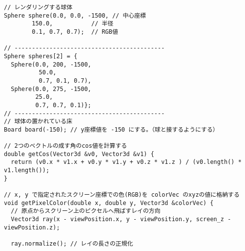 \documentclass{scrartcl}
\begin{document}
\begin{verbatim}
// レンダリングする球体
Sphere sphere(0.0, 0.0, -1500, // 中心座標
        150.0,           // 半径
        0.1, 0.7, 0.7);  // RGB値

// -------------------------------------------
Sphere spheres[2] = {
  Sphere(0.0, 200, -1500,
          50.0,
          0.7, 0.1, 0.7),
  Sphere(0.0, 275, -1500,
         25.0,
         0.7, 0.7, 0.1)};
// -------------------------------------------
// 球体の置かれている床
Board board(-150); // y座標値を -150 にする。（球と接するようにする）

// 2つのベクトルの成す角のcos値を計算する
double getCos(Vector3d &v0, Vector3d &v1) {
  return (v0.x * v1.x + v0.y * v1.y + v0.z * v1.z ) / (v0.length() * v1.length());
}

// x, y で指定されたスクリーン座標での色(RGB)を colorVec のxyzの値に格納する
void getPixelColor(double x, double y, Vector3d &colorVec) {
  // 原点からスクリーン上のピクセルへ飛ばすレイの方向
  Vector3d ray(x - viewPosition.x, y - viewPosition.y, screen_z - viewPosition.z);

  ray.normalize(); // レイの長さの正規化


\end{verbatim}
\end{document}

